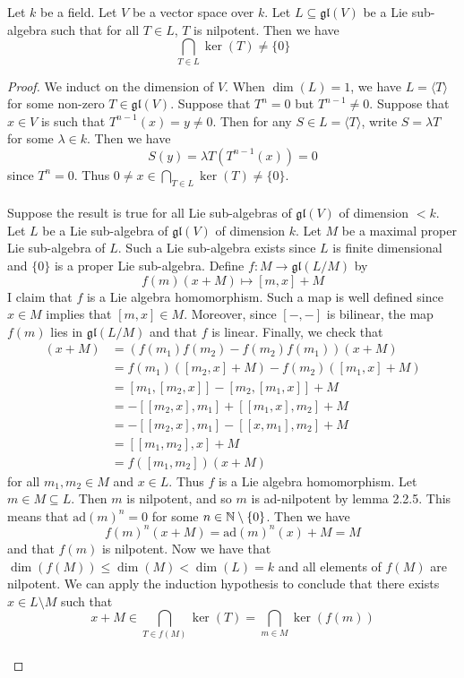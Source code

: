 \documentclass[a4paper]{article}
\begin{document}
\begin{prp}{}{} Let $k$ be a field. Let $V$ be a vector space over $k$. Let $L\subseteq\mathfrak{gl}(V)$ be a Lie sub-algebra such that for all $T\in L$, $T$ is nilpotent. Then we have $$\bigcap_{T\in L}\ker(T)\neq\{0\}$$ \tcbline
\begin{proof}
We induct on the dimension of $V$. When $\dim(L)=1$, we have $L=\langle T\rangle$ for some non-zero $T\in\mathfrak{gl}(V)$. Suppose that $T^n=0$ but $T^{n-1}\neq 0$. Suppose that $x\in V$ is such that $T^{n-1}(x)=y\neq 0$. Then for any $S\in L=\langle T\rangle$, write $S=\lambda T$ for some $\lambda\in k$. Then we have $$S(y)=\lambda T(T^{n-1}(x))=0$$ since $T^n=0$. Thus $0\neq x\in\bigcap_{T\in L}\ker(T)\neq\{0\}$. \\~\\

Suppose the result is true for all Lie sub-algebras of $\mathfrak{gl}(V)$ of dimension $<k$. Let $L$ be a Lie sub-algebra of $\mathfrak{gl}(V)$ of dimension $k$. Let $M$ be a maximal proper Lie sub-algebra of $L$. Such a Lie sub-algebra exists since $L$ is finite dimensional and $\{0\}$ is a proper Lie sub-algebra. Define $f:M\to\mathfrak{gl}(L/M)$ by $$f(m)(x+M)\mapsto[m,x]+M$$ I claim that $f$ is a Lie algebra homomorphism. Such a map is well defined since $x\in M$ implies that $[m,x]\in M$. Moreover, since $[-,-]$ is bilinear, the map $f(m)$ lies in $\mathfrak{gl}(L/M)$ and that $f$ is linear. Finally, we check that 
\begin{align*}
[f(m_1),f(m_2)](x+M)&=(f(m_1)f(m_2)-f(m_2)f(m_1))(x+M)\\
&=f(m_1)([m_2,x]+M)-f(m_2)([m_1,x]+M)\\
&=[m_1,[m_2,x]]-[m_2,[m_1,x]]+M\\
&=-[[m_2,x],m_1]+[[m_1,x],m_2]+M\\
&=-[[m_2,x],m_1]-[[x,m_1],m_2]+M\\
&=[[m_1,m_2],x]+M\tag{Jacobi Identity}\\
&=f([m_1,m_2])(x+M)
\end{align*}
for all $m_1,m_2\in M$ and $x\in L$. Thus $f$ is a Lie algebra homomorphism.  Let $m\in M\subseteq L$. Then $m$ is nilpotent, and so $m$ is ad-nilpotent by lemma 2.2.5. This means that $\text{ad}(m)^n=0$ for some $n\in\mathbb{N}\setminus\{0\}$. Then we have $$f(m)^n(x+M)=\text{ad}(m)^n(x)+M=M$$ and that $f(m)$ is nilpotent. Now we have that $\dim(f(M))\leq\dim(M)<\dim(L)=k$ and all elements of $f(M)$ are nilpotent. We can apply the induction hypothesis to conclude that there exists $x\in L\setminus M$ such that $$x+M\in\bigcap_{T\in f(M)}\ker(T)=\bigcap_{m\in M}\ker(f(m))$$~\\


\end{proof}
\end{prp}
\end{document}
